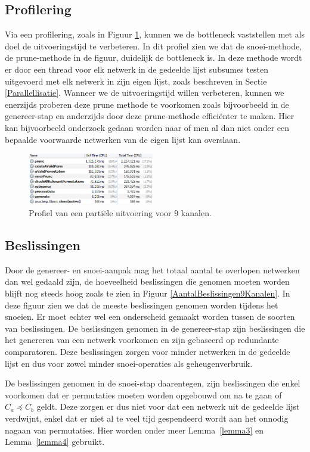 \documentclass{article}
\begin{document}
\subsection{Profilering}\label{Profilering}
Via een profilering, zoals in Figuur \ref{ProfileTime9}, kunnen we de bottleneck vaststellen met als doel de uitvoeringstijd te verbeteren.
In dit profiel zien we dat de snoei-methode, de prune-methode in de figuur, duidelijk de bottleneck is.
In deze methode wordt er door een thread voor elk netwerk in de gedeelde lijst subsumes testen uitgevoerd met elk netwerk in zijn eigen lijst, zoals beschreven in Sectie \ref{Parallellisatie}.
Wanneer we de uitvoeringstijd willen verbeteren, kunnen we enerzijds proberen deze prune methode te voorkomen zoals bijvoorbeeld in de genereer-stap en anderzijds door deze prune-methode effici\"enter te maken.
Hier kan bijvoorbeeld onderzoek gedaan worden naar of men al dan niet onder een bepaalde voorwaarde netwerken van de eigen lijst kan overslaan.
\begin{figure}[!h]
\centering
\vspace{10pt}
\includegraphics[width=0.49\textwidth]{Profile_Time_9.png}
\caption{Profiel van een parti\"ele uitvoering voor $9$ kanalen.}
\label{ProfileTime9}
\end{figure}

\subsection{Beslissingen}
Door de genereer- en snoei-aanpak mag het totaal aantal te overlopen netwerken dan wel gedaald zijn, de hoeveelheid beslissingen die genomen moeten worden blijft nog steeds hoog zoals te zien in Figuur \ref{AantalBeslissingen9Kanalen}.
In deze figuur zien we dat de meeste beslissingen genomen worden tijdens het snoeien.
Er moet echter wel een onderscheid gemaakt worden tussen de soorten van beslissingen.
De beslissingen genomen in de genereer-stap zijn beslissingen die het genereren van een netwerk voorkomen en zijn gebaseerd op redundante comparatoren.
Deze beslissingen zorgen voor minder netwerken in de gedeelde lijst en dus voor zowel minder snoei-operaties als geheugenverbruik.

De beslissingen genomen in de snoei-stap daarentegen, zijn beslissingen die enkel voorkomen dat er permutaties moeten worden opgebouwd om na te gaan of $C_a \preceq C_b$ geldt.
Deze zorgen er dus niet voor dat een netwerk uit de gedeelde lijst verdwijnt, enkel dat er niet al te veel tijd gespendeerd wordt aan het onnodig nagaan van permutaties.
Hier worden onder meer Lemma~\ref{lemma3} en Lemma~\ref{lemma4} gebruikt.
\end{document}
